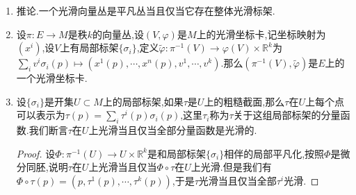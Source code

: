 \begin{enumerate}
\begin{proof}
    	对每个截面$\sigma_i$,复合映射$\Phi\circ\sigma_i\mid V:V\to V\times\mathbb{R}^k$是光滑的,于是存在光滑函数$\sigma_i^j:V\to\mathbb{R}$使得$\Phi\circ\sigma_i(p)=(p,\sigma_i^1(p),\cdots,\sigma_i^k(p))$.于是有$\Phi\circ\Psi(p,v^1,v^2,\cdots,v^k)=(p,\sum_iv^i\sigma_i^1(p),\cdots,\sum_iv^i\sigma_i^k(p))$是光滑的.
    	
    	再证明$(\Phi\circ\Psi)^{-1}$是光滑的,我们有$\left(\sigma_i^j(p)\right)$对每个$p\in V$都是可逆矩阵,它的逆矩阵记作$\left(\tau_i^j(p)\right)$,因为取逆矩阵是$\mathrm{GL}(k,\mathbb{R})$上的光滑映射,于是每个$\tau_i^j$都是光滑函数,于是$(\Phi\circ\Psi)^{-1}(p,w^1,w^2,\cdots,w^k)=(p,\sum_iw^i\tau_i^1(p),\cdots,\sum_iw^i\tau_i^k(p))$是光滑映射.
    \end{proof}
    \item 推论.一个光滑向量丛是平凡丛当且仅当它存在整体光滑标架.
    \item 设$\pi:E\to M$是秩$k$的向量丛,设$(V,\varphi)$是$M$上的光滑坐标卡,记坐标映射为$(x^i)$,设$V$上有局部标架$\{\sigma_i\}$,定义$\widetilde{\varphi}:\pi^{-1}(V)\to\varphi(V)\times\mathbb{R}^k$为$\sum_iv^i\sigma_i(p)\mapsto(x^1(p),\cdots,x^n(p),v^1,\cdots,v^k)$.那么$(\pi^{-1}(V),\widetilde{\varphi})$是$E$上的一个光滑坐标卡.
    \item 设$\{\sigma_i\}$是开集$U\subset M$上的局部标架,如果$\tau$是$U$上的粗糙截面,那么$\tau$在$U$上每个点可以表示为$\tau(p)=\sum_i\tau^i(p)\sigma_i(p)$,这里$\tau_i$称为$\tau$关于这组局部标架的分量函数.我们断言$\tau$在$U$上光滑当且仅当全部分量函数是光滑的.
    \begin{proof}
    	
    	设$\Phi:\pi^{-1}(U)\to U\times\mathbb{R}^k$是和局部标架$\{\sigma_i\}$相伴的局部平凡化,按照$\Phi$是微分同胚,说明$\tau$在$U$上光滑当且仅当$\Phi\circ\tau$在$U$上光滑.但是我们有$\Phi\circ\tau(p)=(p,\tau^1(p),\cdots,\tau^k(p))$,于是$\tau$光滑当且仅当全部$\tau^i$光滑.
    \end{proof}
\end{enumerate}

